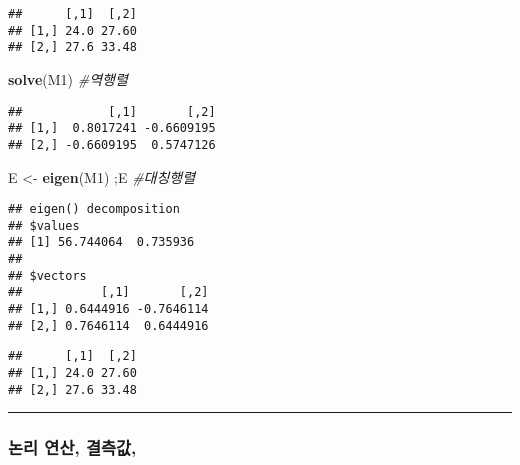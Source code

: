 \documentclass[]{article}
\newenvironment{Shaded}{\begin{snugshade}}{\end{snugshade}}
\newcommand{\KeywordTok}[1]{\textcolor[rgb]{0.13,0.29,0.53}{\textbf{#1}}}
\newcommand{\StringTok}[1]{\textcolor[rgb]{0.31,0.60,0.02}{#1}}
\newcommand{\CommentTok}[1]{\textcolor[rgb]{0.56,0.35,0.01}{\textit{#1}}}
\newcommand{\OperatorTok}[1]{\textcolor[rgb]{0.81,0.36,0.00}{\textbf{#1}}}
\newcommand{\NormalTok}[1]{#1}
\begin{document}
\begin{verbatim}
##      [,1]  [,2]
## [1,] 24.0 27.60
## [2,] 27.6 33.48
\end{verbatim}

\begin{Shaded}
\begin{Highlighting}[]
\KeywordTok{solve}\NormalTok{(M1) }\CommentTok{#역행렬}
\end{Highlighting}
\end{Shaded}

\begin{verbatim}
##            [,1]       [,2]
## [1,]  0.8017241 -0.6609195
## [2,] -0.6609195  0.5747126
\end{verbatim}

\begin{Shaded}
\begin{Highlighting}[]
\NormalTok{E <-}\StringTok{ }\KeywordTok{eigen}\NormalTok{(M1) ;E }\CommentTok{#대칭행렬}
\end{Highlighting}
\end{Shaded}

\begin{verbatim}
## eigen() decomposition
## $values
## [1] 56.744064  0.735936
## 
## $vectors
##           [,1]       [,2]
## [1,] 0.6444916 -0.7646114
## [2,] 0.7646114  0.6444916
\end{verbatim}

\begin{Shaded}
\end{Shaded}

\begin{verbatim}
##      [,1]  [,2]
## [1,] 24.0 27.60
## [2,] 27.6 33.48
\end{verbatim}

\begin{center}\rule{0.5\linewidth}{\linethickness}\end{center}

\subsubsection{논리 연산, 결측값,}\label{--}
\end{document}
